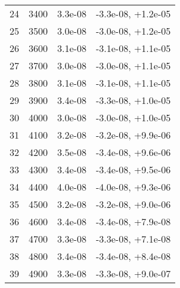 \begin{table}
\begin{adjustbox}{width=1\textwidth/2}
\begin{tabular}{|c|c|c|c|}
\cline{1-4}
24 & 3400 & 3.3e-08 & -3.3e-08, +1.2e-05 \\
\cline{1-4}
25 & 3500 & 3.0e-08 & -3.0e-08, +1.2e-05 \\
\cline{1-4}
26 & 3600 & 3.1e-08 & -3.1e-08, +1.1e-05 \\
\cline{1-4}
27 & 3700 & 3.0e-08 & -3.0e-08, +1.1e-05 \\
\cline{1-4}
28 & 3800 & 3.1e-08 & -3.1e-08, +1.1e-05 \\
\cline{1-4}
29 & 3900 & 3.4e-08 & -3.3e-08, +1.0e-05 \\
\cline{1-4}
30 & 4000 & 3.0e-08 & -3.0e-08, +1.0e-05 \\
\cline{1-4}
31 & 4100 & 3.2e-08 & -3.2e-08, +9.9e-06 \\
\cline{1-4}
32 & 4200 & 3.5e-08 & -3.4e-08, +9.6e-06 \\
\cline{1-4}
33 & 4300 & 3.4e-08 & -3.4e-08, +9.5e-06 \\
\cline{1-4}
34 & 4400 & 4.0e-08 & -4.0e-08, +9.3e-06 \\
\cline{1-4}
35 & 4500 & 3.2e-08 & -3.2e-08, +9.0e-06 \\
\cline{1-4}
36 & 4600 & 3.4e-08 & -3.4e-08, +7.9e-08 \\
\cline{1-4}
37 & 4700 & 3.3e-08 & -3.3e-08, +7.1e-08 \\
\cline{1-4}
38 & 4800 & 3.4e-08 & -3.4e-08, +8.4e-08 \\
\cline{1-4}
39 & 4900 & 3.3e-08 & -3.3e-08, +9.0e-07 \\
\cline{1-4}
\end{tabular}
\end{adjustbox}
\end{table}

